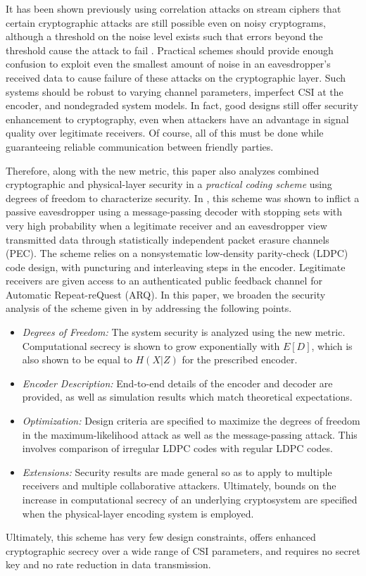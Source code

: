 \documentclass[10pt,twocolumn,twoside]{IEEEtran} \newlength{\pic}
\theoremstyle{definition}
\theoremstyle{remark}
\theoremstyle{plain}
\begin{document}
It has been shown previously using correlation attacks on stream ciphers that certain cryptographic attacks are still possible even on noisy cryptograms, although a threshold on the noise level exists such that errors beyond the threshold cause the attack to fail \cite{Meier89, Harrison09_ICC, Harrison09_ISIT, Harrison09_ITW}. Practical schemes should provide enough confusion to exploit even the smallest amount of noise in an eavesdropper's received data to cause failure of these attacks on the cryptographic layer. Such systems should be robust to varying channel parameters, imperfect CSI at the encoder, and nondegraded system models. In fact, good designs still offer security enhancement to cryptography, even when attackers have an advantage in signal quality over legitimate receivers. Of course, all of this must be done while guaranteeing reliable communication between friendly parties.

Therefore, along with the new metric, this paper also analyzes combined cryptographic and physical-layer security in a \emph{practical coding scheme} using degrees of freedom to characterize security. In \cite{Harrison10_ITW}, this scheme was shown to inflict a passive eavesdropper using a message-passing decoder with stopping sets with very high probability when a legitimate receiver and an eavesdropper view transmitted data through statistically independent packet erasure channels (PEC). The scheme relies on a nonsystematic low-density parity-check (LDPC) code design, with puncturing and interleaving steps in the encoder. Legitimate receivers are given access to an authenticated public feedback channel for Automatic Repeat-reQuest (ARQ). In this paper, we broaden the security analysis of the scheme given in \cite{Harrison10_ITW} by addressing the following points.
\begin{itemize}
  \item \emph{Degrees of Freedom:} The system security is analyzed using the new metric. Computational secrecy is shown to grow exponentially with $E[D]$, which is also shown to be equal to $H(X|Z)$ for the prescribed encoder.
  \item \emph{Encoder Description:} End-to-end details of the encoder and decoder are provided, as well as simulation results which match theoretical expectations.
  \item \emph{Optimization:} Design criteria are specified to maximize the degrees of freedom in the maximum-likelihood attack as well as the message-passing attack. This involves comparison of irregular LDPC codes with regular LDPC codes.
  \item \emph{Extensions:} Security results are made general so as to apply to multiple receivers and multiple collaborative attackers. Ultimately, bounds on the increase in computational secrecy of an underlying cryptosystem are specified when the physical-layer encoding system is employed.
\end{itemize}
Ultimately, this scheme has very few design constraints, offers enhanced cryptographic secrecy over a wide range of CSI parameters, and requires no secret key and no rate reduction in data transmission.
\end{document}
